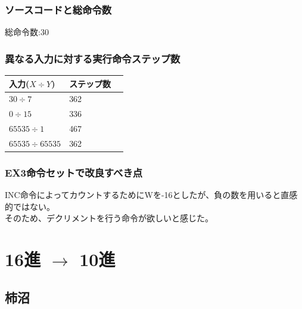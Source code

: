 \documentclass[dvipdfmx,12pt]{jreport}
\begin{document}
\subsubsection{ソースコードと総命令数}

総命令数:30

\subsubsection{異なる入力に対する実行命令ステップ数}
\begin{table}[h]
  \begin{tabular}{|l|l|l|} \hline
    入力($X \div Y$) & ステップ数 \\ \hline
    $30 \div 7$ & 362 \\ \hline
    $0 \div 15$ & 336 \\ \hline
    $65535 \div 1$ & 467 \\ \hline
    $65535 \div 65535$ & 362 \\ \hline
  \end{tabular}
\end{table}

\subsubsection{EX3命令セットで改良すべき点}
INC命令によってカウントするためにWを-16としたが、負の数を用いると直感的ではない。 \\
そのため、デクリメントを行う命令が欲しいと感じた。\\

\section*{16進 $\rightarrow$ 10進}
\subsection*{柿沼}
\end{document}
